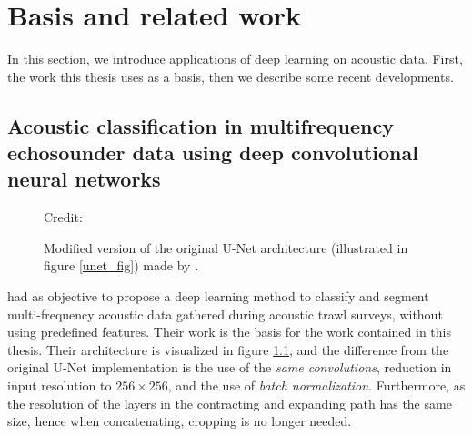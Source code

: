 \chapter{Basis and related work} \label{computer vision}
    In this section, we introduce applications of deep learning on acoustic data. First, the work this thesis uses as a basis, then we describe some recent developments.
    

    


\section{Acoustic classification in multifrequency echosounder data using
deep convolutional neural networks} \label{unet_paper_acoustic}
    
        \begin{figure}[H]
        \centering
        
        \caption[U-Net architecture]{Modified version of the original U-Net  architecture (illustrated in figure \ref{unet_fig}) made by \citet{brautaset2020acoustic}. }
      	\medskip 
        \label{unet__brautset_fig}
        \hspace*{15pt}\hbox{\scriptsize Credit: \citeauthor{brautaset2020acoustic} \cite{brautaset2020acoustic}}
    \end{figure}
    
    
    \citeauthor{brautaset2020acoustic} \cite{brautaset2020acoustic} had as objective to propose a deep learning method to classify and segment multi-frequency acoustic data gathered during acoustic trawl surveys, without using predefined features. Their work is the basis for the work contained in this thesis. Their architecture is visualized in figure \ref{unet__brautset_fig}, and the difference from the original U-Net implementation is the use of the \textit{same convolutions}, reduction in input resolution to $256\times256$, and the use of \textit{batch normalization}. Furthermore, as the resolution of the layers in the contracting and expanding path has the same size, hence when concatenating, cropping is no longer needed.
    
